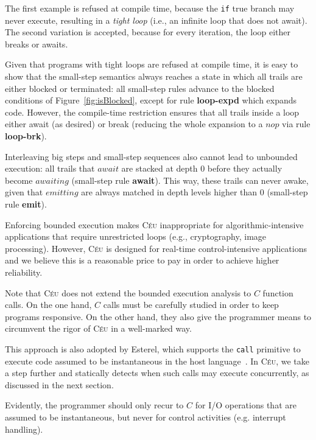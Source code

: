 \documentclass[preprint]{sigplanconf}
\newcommand{\CEU}{\textsc{C\'{e}u}\xspace}
\newcommand{\code}[1] {{\small{\texttt{#1}}}}
\newcommand{\1}{\;}
\newcommand{\2}{\;\;}
\newcommand{\3}{\;\;\;}
\newcommand{\5}{\;\;\;\;\;}
\begin{document}
The first example is refused at compile time, because the \code{if} true branch 
may never execute, resulting in a \emph{tight loop} (i.e., an infinite loop 
that does not await).
The second variation is accepted, because for every iteration, the loop either 
breaks or awaits.


Given that programs with tight loops are refused at compile time, it is easy to 
show that the small-step semantics always reaches a state in which all trails 
are either blocked or terminated:
all small-step rules advance to the blocked conditions of 
Figure~\ref{fig:isBlocked}, except for rule \textbf{loop-expd} which expands 
code.
However, the compile-time restriction ensures that all trails inside a loop 
either await (as desired) or break (reducing the whole expansion to a $nop$ via 
rule \textbf{loop-brk}).

Interleaving big steps and small-step sequences also cannot lead to unbounded 
execution:
all trails that $await$ are stacked at depth $0$ before they actually become 
$awaiting$ (small-step rule \textbf{await}).
This way, these trails can never awake, given that $emitting$ are always 
matched in depth levels higher than $0$ (small-step rule \textbf{emit}).


Enforcing bounded execution makes \CEU inappropriate for algorithmic-intensive 
applications that require unrestricted loops (e.g., cryptography, image processing).
However, \CEU is designed for real-time control-intensive applications and we 
believe this is a reasonable price to pay in order to achieve higher 
reliability.

Note that \CEU does not extend the bounded execution analysis to $C$ function 
calls. %
On the one hand, $C$ calls must be carefully studied in order to keep programs 
responsive.
On the other hand, they also give the programmer means to circumvent the rigor 
of \CEU in a well-marked way.

This approach is also adopted by Esterel, which supports the \code{call} 
primitive to execute code assumed to be instantaneous in the host 
language~\cite{esterel.primer}.
In \CEU, we take a step further and statically detects when such calls may 
execute concurrently, as discussed in the next section.

Evidently, the programmer should only recur to $C$ for I/O operations that are 
assumed to be instantaneous, but never for control activities (e.g. interrupt 
handling).
\end{document}

